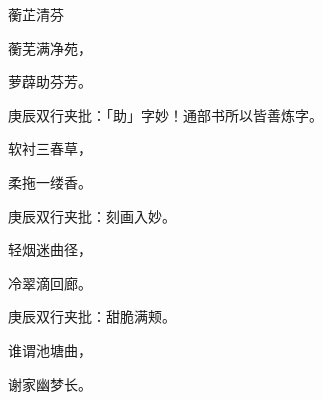 \begin{poem}
    \begin{pl}蘅芷清芬\end{pl}

    \begin{pl}蘅芜满净苑，\end{pl}

    \begin{pl}萝薜助芬芳。\end{pl}\begin{note}庚辰双行夹批：「助」字妙！通部书所以皆善炼字。\end{note}

    \begin{pl}软衬三春草，\end{pl}

    \begin{pl}柔拖一缕香。\end{pl}\begin{note}庚辰双行夹批：刻画入妙。\end{note}

    \begin{pl}轻烟迷曲径，\end{pl}

    \begin{pl}冷翠滴回廊。\end{pl}\begin{note}庚辰双行夹批：甜脆满颊。\end{note}

    \begin{pl}谁谓池塘曲，\end{pl}

    \begin{pl}谢家幽梦长。\end{pl}

\end{poem}

